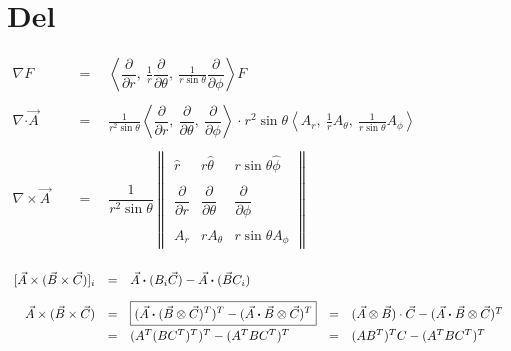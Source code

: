 \documentclass[12pt]{article}
\newcommand*{\dotP}{\boldsymbol \cdot}		%
\begin{document}
\section{Del}
\vspace{5pt}
\(\begin{aligned}
	\nabla F \quad &= \quad \left \langle \dfrac{\partial}{\partial r} , 
		\ \frac{1}{r} \dfrac{\partial}{\partial \theta} , 
		\ \frac{1}{ r \sin{\theta} } \dfrac{\partial}{\partial \phi} \right \rangle F \\
	\\
	\nabla \dotP \vec{A} \quad &= \quad \frac{1}{r^2 \sin{\theta}} \left\langle \dfrac{\partial}{\partial r} , 
		\ \dfrac{\partial}{\partial \theta} , \ \dfrac{\partial}{\partial \phi} \right\rangle 
		\ \dotP \ r^2 \sin{\theta} 
		\left\langle A_r , \ \frac{1}{r} A_\theta , \ \frac{1}{ r \sin{\theta} } A_\phi \right\rangle \\
	\\
	\nabla \times \vec{A} \quad &= \quad \dfrac{1}{ r^2 \sin{\theta} } 
		\begin{Vmatrix}
			\hat{r} 					 & r \hat{\theta} 			    & r \sin{\theta} \hat{\phi}\\ \\
			\dfrac{\partial}{\partial r} & \dfrac{\partial}{\partial \theta} & \dfrac{\partial}{\partial \phi}\\ \\
			A_r							 & r A_\theta				    & r \sin{\theta} A_\phi
		\end{Vmatrix} \\
\end{aligned}\)

\vspace{20pt}
\(\begin{array}{r c l c l}
	\relax[ \vec{A} \times (\vec{B} \times \vec{C}) ]_i 
		&=& \vec{A} \dotP ( B_i \vec{C} ) - \vec{A} \dotP ( \vec{B} C_i ) 
		\\[10pt]
	\vec{A} \times (\vec{B} \times \vec{C}) 
		&=& \boxed{ ( \vec{A} \dotP ( \vec{B} \otimes \vec{C} )^T )^T - ( \vec{A} \dotP \vec{B} \otimes \vec{C} )^T }
		&=& ( \vec{A} \otimes \vec{B} ) \cdot \vec{C} - ( \vec{A} \dotP \vec{B} \otimes \vec{C} )^T 
		\\[5pt]
	&=& ( A^T ( BC^T )^T )^T - ( A^T BC^T )^T
		&=& (AB^T)^T C - ( A^T BC^T )^T
\end{array}\)
\end{document}
